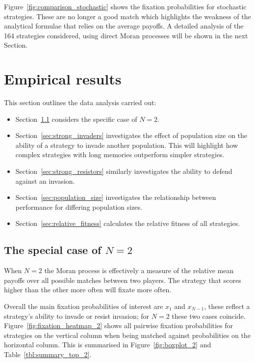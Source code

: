 \documentclass{article}
\begin{document}
Figure~\ref{fig:comparison_stochastic} shows the fixation probabilities for
stochastic strategies. These are no longer a good match which highlights the
weakness of the analytical formulae that relies on the average payoffs. A
detailed analysis of the 164 strategies considered, using direct Moran processes
will be shown in the next Section.




\section{Empirical results}\label{sec:empirical_results}


This section outlines the data analysis carried out:

\begin{itemize}
    \item Section~\ref{sec:two_individuals} considers the specific case of
        \(N=2\).
    \item Section~\ref{sec:strong_invaders} investigates the effect of
        population size on the ability of a strategy to invade another
        population. This will highlight how complex strategies with long
        memories outperform simpler strategies.
    \item Section~\ref{sec:strong_resistors} similarly investigates the
        ability to defend against an invasion.
    \item Section~\ref{sec:population_size} investigates the relationship
        between performance for differing population sizes.
    \item Section~\ref{sec:relative_fitness} calculates the relative fitness of all
        strategies.
\end{itemize}

\subsection{The special case of \(N=2\)}\label{sec:two_individuals}

When $N=2$ the Moran process is effectively a measure of the relative
mean payoffs over all possible matches between two players. The strategy
that scores higher than the other more often will fixate more often.

Overall the main fixation probabilities of interest are \(x_1\) and \(x_{N-1}\), these
reflect a strategy's ability to invade or resist invasion; for \(N=2\) these two cases
coincide. Figure~\ref{fig:fixation_heatmap_2} shows
all pairwise fixation probabilities for strategies on the vertical column when
being matched against probabilities on the horizontal column. This is summarised
in Figure~\ref{fig:boxplot_2} and Table~\ref{tbl:summary_top_2}.
\end{document}
